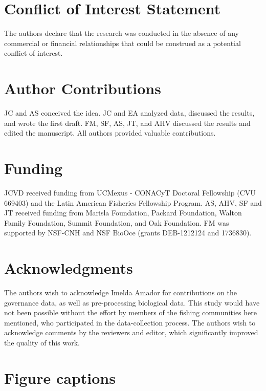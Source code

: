 \documentclass{frontiersSCNS}
\begin{document}
\section*{Conflict of Interest Statement}

The authors declare that the research was conducted in the absence of
any commercial or financial relationships that could be construed as a
potential conflict of interest.

\section*{Author Contributions}

JC and AS conceived the idea. JC and EA analyzed data, discussed the
results, and wrote the first draft. FM, SF, AS, JT, and AHV discussed
the results and edited the manuscript. All authors provided valuable
contributions.

\section*{Funding}

JCVD received funding from UCMexus - CONACyT Doctoral Fellowship (CVU
669403) and the Latin American Fisheries Fellowship Program. AS, AHV, SF
and JT received funding from Marisla Foundation, Packard Foundation,
Walton Family Foundation, Summit Foundation, and Oak Foundation. FM was
supported by NSF-CNH and NSF BioOce (grants DEB-1212124 and 1736830).

\section*{Acknowledgments}

The authors wish to acknowledge Imelda Amador for contributions on the
governance data, as well as pre-processing biological data. This study
would have not been possible without the effort by members of the
fishing communities here mentioned, who participated in the
data-collection process. The authors wish to acknowledge comments by the
reviewers and editor, which significantly improved the quality of this
work.

\clearpage




\clearpage

\section*{Figure captions}
\end{document}

